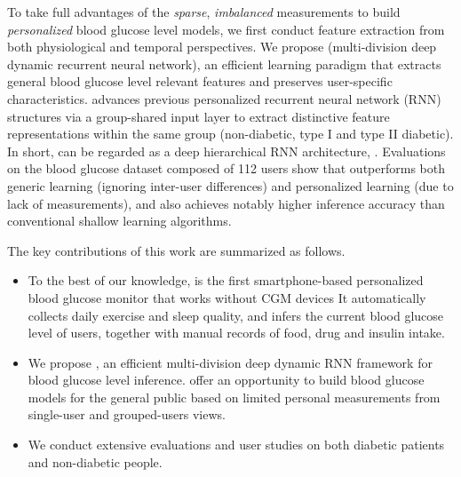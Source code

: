 To take full advantages of the \textit{sparse}, \textit{imbalanced} measurements to build \textit{personalized} blood glucose level models, we first conduct feature extraction from both physiological and temporal perspectives.
We propose \modelname (multi-division deep dynamic recurrent neural network), an efficient learning paradigm that extracts general blood glucose level relevant features and preserves user-specific characteristics.
\modelname advances previous personalized recurrent neural network (RNN) structures via a group-shared input layer to extract distinctive feature representations within the same group (\ie non-diabetic, type I and type II diabetic).
In short, \modelname can be regarded as a deep hierarchical RNN architecture, .
Evaluations on the blood glucose dataset composed of 112 users  show that \modelname outperforms both generic learning (\ie ignoring inter-user differences) and personalized learning (due to lack of measurements), and also achieves notably higher inference accuracy than conventional shallow learning algorithms.

The key contributions of this work are summarized as follows.
\begin{itemize}
  \item
  To the best of our knowledge, \sysname is the first smartphone-based personalized blood glucose monitor that works without CGM devices 
  It automatically collects daily exercise and sleep quality, and infers the current blood glucose level of users, together with manual records of food, drug and insulin intake. 
  \item
  We propose \modelname, an efficient multi-division deep dynamic RNN framework for blood glucose level inference.
   offer an opportunity to build blood glucose models for the general public based on limited personal measurements from single-user and grouped-users views.
  \item
  We conduct extensive evaluations and user studies on both diabetic patients and non-diabetic people.
\end{itemize}

